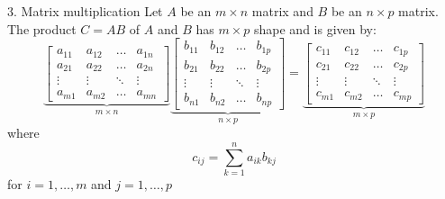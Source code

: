 \documentclass[fullscreen=true, bookmarks=true, hyperref={pdfencoding=unicode}]{beamer}
\begin{document}
\begin{frame}{3. Matrix multiplication}
  Let $A$ be an $m \times n$ matrix and $B$ be an $n \times p$ matrix. 
  The product $C = AB$ of $A$ and $B$ has $m \times p$ shape and is given by:
  {\small
  \[
  \underbrace{
    \begin{bmatrix}
    a_{11} & a_{12} & \dots & a_{1n} \\
    a_{21} & a_{22} & \dots & a_{2n} \\
    \vdots & \vdots & \ddots & \vdots \\
    a_{m1} & a_{m2} & \dots & a_{mn}
    \end{bmatrix}
  }_{m \times n}
  \underbrace{
    \begin{bmatrix}
    b_{11} & b_{12} & \dots & b_{1p} \\
    b_{21} & b_{22} & \dots & b_{2p} \\
    \vdots & \vdots & \ddots & \vdots \\
    b_{n1} & b_{n2} & \dots & b_{np}
    \end{bmatrix}
  }_{n \times p}
    =
  \underbrace{
      \begin{bmatrix}
    c_{11} & c_{12} & \dots & c_{1p} \\
    c_{21} & c_{22} & \dots & c_{2p} \\
    \vdots & \vdots & \ddots & \vdots \\
    c_{m1} & c_{m2} & \dots & c_{mp}
    \end{bmatrix}
  }_{m \times p}
    \]
  }
  where $$c_{ij} = \sum\limits_{k=1}^n a_{ik}b_{kj}$$ 
  for $i=1,\dots,m$ and $j=1,\dots,p$
\end{frame}
\end{document}
